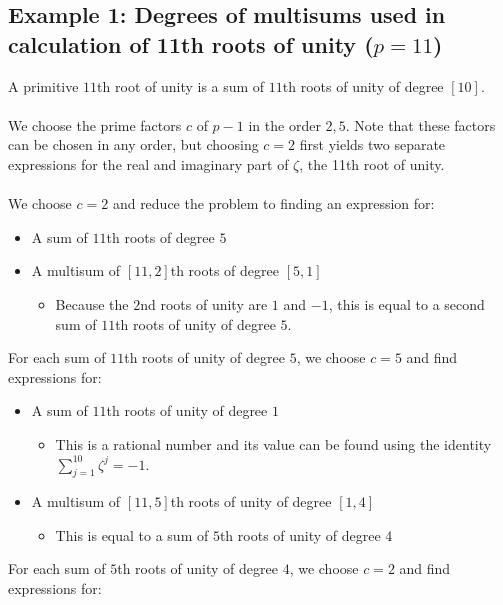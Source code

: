 \documentclass{article}
\begin{document}
    \subsection{Example 1: Degrees of multisums used in calculation of 11th roots of unity ($ p = 11 $)}
        A primitive $ 11 $th root of unity is a sum of $ 11 $th roots of unity of degree $ [10] $.\\
        \\
        We choose the prime factors $ c $ of $ p - 1 $ in the order $ 2, 5 $. Note that these factors can be chosen in any order, but choosing $ c = 2 $ first yields two separate expressions for the real and imaginary part of $ \zeta $, the 11th root of unity.\\
        \\
        We choose $ c = 2 $ and reduce the problem to finding an expression for:
        \begin{itemize}
            \item A sum of $ 11 $th roots of degree $ 5 $
            \item A multisum of $ [11, 2] $th roots of degree $ [5, 1] $
            \begin{itemize}
                \item Because the $ 2 $nd roots of unity are $ 1 $ and $ -1 $, this is equal to a second sum of $ 11 $th roots of unity of degree $ 5 $.
            \end{itemize}
        \end{itemize}
        For each sum of $ 11 $th roots of unity of degree $ 5 $, we choose $ c = 5 $ and find expressions for:
        \begin{itemize}
            \item A sum of $ 11 $th roots of unity of degree $ 1 $
            \begin{itemize}
                \item This is a rational number and its value can be found using the identity $ \sum_{j = 1}^{10} \zeta^j = -1 $.
            \end{itemize}
            \item A multisum of $ [11, 5] $th roots of unity of degree $ [1, 4] $
            \begin{itemize}
                \item This is equal to a sum of $ 5 $th roots of unity of degree $ 4 $
            \end{itemize}
        \end{itemize}
        For each sum of $ 5 $th roots of unity of degree $ 4 $, we choose $ c = 2 $ and find expressions for:
\end{document}
